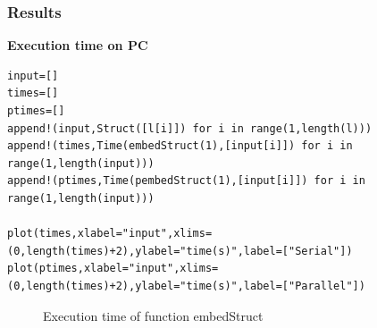 \documentclass[a4paper,12pt]{article}
\begin{document}
\subsubsection{Results}
\textbf{Execution time on PC}
\begin{Verbatim}[fontsize=\footnotesize]
input=[]
times=[]
ptimes=[]
append!(input,Struct([l[i]]) for i in range(1,length(l)))
append!(times,Time(embedStruct(1),[input[i]]) for i in range(1,length(input)))
append!(ptimes,Time(pembedStruct(1),[input[i]]) for i in range(1,length(input)))

plot(times,xlabel="input",xlims=(0,length(times)+2),ylabel="time(s)",label=["Serial"])
plot(ptimes,xlabel="input",xlims=(0,length(times)+2),ylabel="time(s)",label=["Parallel"])
\end{Verbatim}
\begin{figure}[!h]
	\centering
	\caption{Execution time of function embedStruct}
\end{figure}
\end{document}
